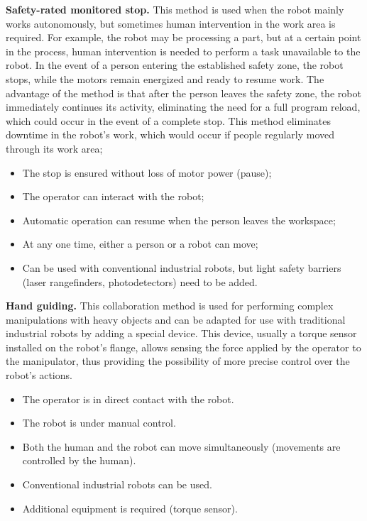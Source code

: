 \textbf{Safety-rated monitored stop.} This method is used when the robot mainly works autonomously, but sometimes human intervention in the work area is required. For example, the robot may be processing a part, but at a certain point in the process, human intervention is needed to perform a task unavailable to the robot. In the event of a person entering the established safety zone, the robot stops, while the motors remain energized and ready to resume work. The advantage of the method is that after the person leaves the safety zone, the robot immediately continues its activity, eliminating the need for a full program reload, which could occur in the event of a complete stop. This method eliminates downtime in the robot's work, which would occur if people regularly moved through its work area;
\begin{itemize}
	\item The stop is ensured without loss of motor power (pause);
	\item The operator can interact with the robot;
	\item Automatic operation can resume when the person leaves the workspace;
	\item At any one time, either a person or a robot can move;
	\item Can be used with conventional industrial robots, but light safety barriers (laser rangefinders, photodetectors) need to be added.
\end{itemize}

\textbf{Hand guiding.}
This collaboration method is used for performing complex manipulations with heavy objects and can be adapted for use with traditional industrial robots by adding a special device. This device, usually a torque sensor installed on the robot's flange, allows sensing the force applied by the operator to the manipulator, thus providing the possibility of more precise control over the robot's actions.

\begin{itemize}
	\item The operator is in direct contact with the robot.
	\item The robot is under manual control.
	\item Both the human and the robot can move simultaneously (movements are controlled by the human).
	\item Conventional industrial robots can be used.
	\item Additional equipment is required (torque sensor).
\end{itemize}

